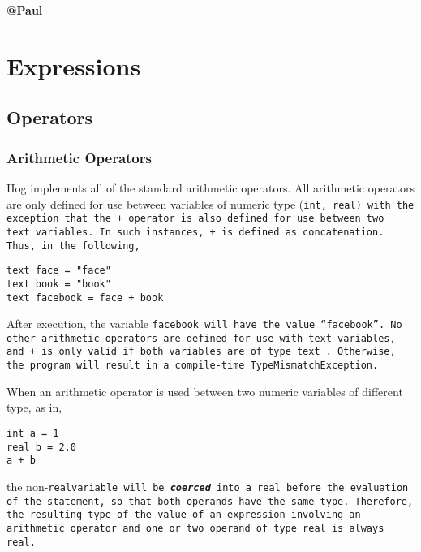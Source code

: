 \documentclass{book}
\begin{document}
\textbf{@Paul}



\chapter{Expressions} %
\label{cha:expressions}

\section{Operators} %
\label{sec:operators}

\subsection{Arithmetic Operators} %
\label{sub:arithmetic_operators}

Hog implements all of the standard arithmetic operators. All arithmetic operators are only defined for use between variables of
numeric type (\tt int\rm, \tt real\rm) with the exception that the \tt + \rm operator is also defined for use between two \tt
text \rm variables. In such instances, \tt + \rm is defined as concatenation. Thus, in the following,

\begin{verbatim}
text face = "face"
text book = "book"
text facebook = face + book
\end{verbatim}

After execution, the variable \tt facebook \rm will have the value ``facebook''. No other arithmetic operators are defined for
use with \tt text \rm variables, and \tt + \rm is only valid if both variables are of type \tt text \rm. Otherwise, the program
will result in a compile-time \tt TypeMismatchException\rm. 

When an arithmetic operator is used between two numeric variables of different type, as in,

\begin{verbatim}
int a = 1
real b = 2.0
a + b
\end{verbatim}

the non-\tt real\rm variable will be \textbf{\emph{coerced}} into a \tt real \rm before the evaluation of the statement, so
that both operands have the same type. Therefore, the resulting type of the value of an expression involving an arithmetic
operator and one or two operand of type \tt real \rm is always \tt real\rm.
\end{document}
